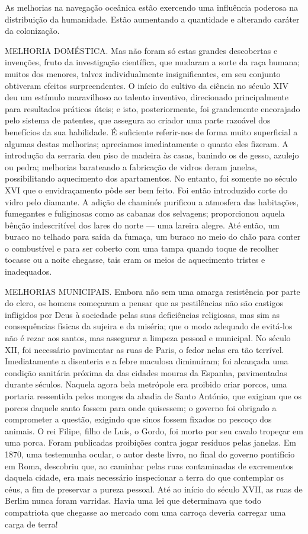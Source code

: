 \documentclass[11pt,a5paper,twoside,openany]{book}
\begin{document}
As melhorias na navegação oceânica estão exercendo uma influência poderosa na distribuição da humanidade. Estão aumentando a quantidade e alterando caráter da colonização.

MELHORIA DOMÉSTICA. Mas não foram só estas grandes descobertas e invenções, fruto da investigação científica, que mudaram a sorte da raça humana; muitos dos menores, talvez individualmente insignificantes, em seu conjunto obtiveram efeitos surpreendentes. O início do cultivo da ciência no século XIV deu um estímulo maravilhoso ao talento inventivo, direcionado principalmente para resultados práticos úteis; e isto, posteriormente, foi grandemente encorajado pelo sistema de patentes, que assegura ao criador uma parte razoável dos benefícios da sua habilidade. É suficiente referir-nos de forma muito superficial a algumas destas melhorias; apreciamos imediatamente o quanto eles fizeram. A introdução da serraria deu piso de madeira às casas, banindo os de gesso, azulejo ou pedra; melhorias barateando a fabricação de vidros deram janelas, possibilitando aquecimento dos apartamentos. No entanto, foi somente no século XVI que o envidraçamento pôde ser bem feito. Foi então introduzido corte do vidro pelo diamante. A adição de chaminés purificou a atmosfera das habitações, fumegantes e fuliginosas como as cabanas dos selvagens; proporcionou aquela bênção indescritível dos lares do norte — uma lareira alegre. Até então, um buraco no telhado para saída da fumaça, um buraco no meio do chão para conter o combustível e para ser coberto com uma tampa quando toque de recolher tocasse ou a noite chegasse, tais eram os meios de aquecimento tristes e inadequados.

MELHORIAS MUNICIPAIS. Embora não sem uma amarga resistência por parte do clero, os homens começaram a pensar que as pestilências não são castigos infligidos por Deus à sociedade pelas suas deficiências religiosas, mas sim as consequências físicas da sujeira e da miséria; que o modo adequado de evitá-los não é rezar aos santos, mas assegurar a limpeza pessoal e municipal. No século XII, foi necessário pavimentar as ruas de Paris, o fedor nelas era tão terrível. Imediatamente a disenteria e a febre maculosa diminuíram; foi alcançada uma condição sanitária próxima da das cidades mouras da Espanha, pavimentadas durante séculos. Naquela agora bela metrópole era proibido criar porcos, uma portaria ressentida pelos monges da abadia de Santo António, que exigiam que os porcos daquele santo fossem para onde quisessem; o governo foi obrigado a comprometer a questão, exigindo que sinos fossem fixados no pescoço dos animais. O rei Filipe, filho de Luís, o Gordo, foi morto por seu cavalo tropeçar em uma porca. Foram publicadas proibições contra jogar resíduos pelas janelas. Em 1870, uma testemunha ocular, o autor deste livro, no final do governo pontifício em Roma, descobriu que, ao caminhar pelas ruas contaminadas de excrementos daquela cidade, era mais necessário inspecionar a terra do que contemplar os céus, a fim de preservar a pureza pessoal. Até ao início do século XVII, as ruas de Berlim nunca foram varridas. Havia uma lei que determinava que todo compatriota que chegasse ao mercado com uma carroça deveria carregar uma carga de terra!
\end{document}
